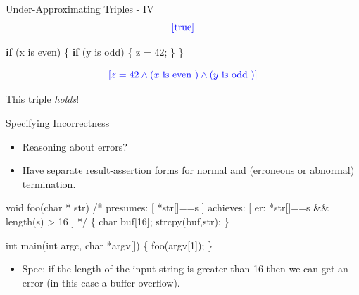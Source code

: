 \documentclass[
  10pt,
  ignorenonframetext,
]{beamer}
\newenvironment{Shaded}{\begin{snugshade}}{\end{snugshade}}
\newcommand{\CommentTok}[1]{\textcolor[rgb]{0.48,0.49,0.49}{#1}}
\newcommand{\ControlFlowTok}[1]{\textcolor[rgb]{0.99,0.74,0.29}{\textbf{#1}}}
\newcommand{\DataTypeTok}[1]{\textcolor[rgb]{0.16,0.50,0.73}{#1}}
\newcommand{\DecValTok}[1]{\textcolor[rgb]{0.96,0.45,0.00}{#1}}
\newcommand{\NormalTok}[1]{\textcolor[rgb]{0.81,0.81,0.76}{#1}}
\newcommand{\OperatorTok}[1]{\textcolor[rgb]{0.81,0.81,0.76}{#1}}
\providecommand{\tightlist}{%
  \setlength{\itemsep}{0pt}\setlength{\parskip}{0pt}}
\newcommand{\blue}[1]{\textcolor{blue}{#1}}
\newcommand{\true}{\mathrm{true}}
\begin{document}
\begin{frame}[fragile]{Under-Approximating Triples - IV}
\label{under-approximating-triples---iv}
\[
\blue{[\true]}
\]

\begin{Shaded}
\begin{Highlighting}[]
\ControlFlowTok{if} \OperatorTok{(}\NormalTok{x is even}\OperatorTok{)} \OperatorTok{\{}
    \ControlFlowTok{if} \OperatorTok{(}\NormalTok{y is odd}\OperatorTok{)} \OperatorTok{\{}
\NormalTok{        z }\OperatorTok{=} \DecValTok{42}\OperatorTok{;}
    \OperatorTok{\}}
\OperatorTok{\}}
\end{Highlighting}
\end{Shaded}

\[
\blue{[z = 42 \land (x \text{ is even }) \land (y \text{ is odd })]}
\]

\pause

This triple \emph{holds}!
\end{frame}

\begin{frame}[fragile]{Specifying Incorrectness}
\label{specifying-incorrectness}
\begin{itemize}
\tightlist
\item
  Reasoning about errors?
\end{itemize}

\pause

\begin{itemize}
\tightlist
\item
  Have separate result-assertion forms for normal and (erroneous or
  abnormal) termination.
\end{itemize}

\begin{Shaded}
\begin{Highlighting}[]
\DataTypeTok{void}\NormalTok{ foo}\OperatorTok{(}\DataTypeTok{char} \OperatorTok{*}\NormalTok{ str}\OperatorTok{)}
\CommentTok{/* presumes: [ *str[]==s ]}
\CommentTok{   achieves: [ er: *str[]==s \&\& length(s) \textgreater{} 16 ] */}
\OperatorTok{\{}
    \DataTypeTok{char}\NormalTok{ buf}\OperatorTok{[}\DecValTok{16}\OperatorTok{];}
\NormalTok{    strcpy}\OperatorTok{(}\NormalTok{buf}\OperatorTok{,}\NormalTok{str}\OperatorTok{);}
\OperatorTok{\}}

\DataTypeTok{int}\NormalTok{ main}\OperatorTok{(}\DataTypeTok{int}\NormalTok{ argc}\OperatorTok{,} \DataTypeTok{char} \OperatorTok{*}\NormalTok{argv}\OperatorTok{[])}
\OperatorTok{\{}\NormalTok{ foo}\OperatorTok{(}\NormalTok{argv}\OperatorTok{[}\DecValTok{1}\OperatorTok{]);} \OperatorTok{\}}
\end{Highlighting}
\end{Shaded}

\begin{itemize}
\tightlist
\item
  Spec: if the length of the input string is greater than 16 then we can
  get an error (in this case a buffer overflow).
\end{itemize}
\end{frame}
\end{document}
